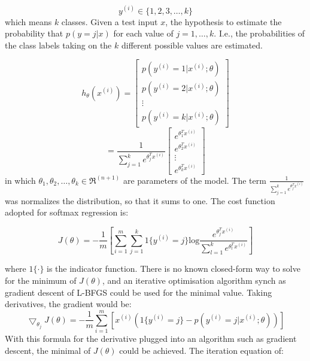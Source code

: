 \documentclass[journal]{IEEEtran}
\begin{document}
\begin{equation}
y^{(i)} \in \{1,2,3,\ldots,k\}
\end{equation}
\noindent which means $k$ classes.
Given a test input $x$, the hypothesis to estimate the probability that $p(y=j|x)$ for each value of $j=1,\ldots,k$. I.e., the probabilities of the class labels taking on the $k$ different possible values are estimated. 

\begin{equation}
h_{\theta}(x^{(i)}) = 
\left[
      \begin{array}{cccccc}
        p(y^{(i)}=1|x^{(i)};\theta) \\
        p(y^{(i)}=2|x^{(i)};\theta) \\
        \vdots \\
        p(y^{(i)}=k|x^{(i)};\theta)
      \end{array}
    \right]
\end{equation}
\begin{equation}
= \frac{1}{\sum_{j=1}^ke^{\theta_j^Tx^{(i)}}}
\left[
      \begin{array}{cccccc}
        e^{\theta_1^Tx^{(i)}}\\
        e^{\theta_2^Tx^{(i)}}\\
        \vdots \\
        e^{\theta_k^Tx^{(i)}}
      \end{array}
    \right]
\end{equation}
\noindent in which $\theta_1,\theta_2,\ldots,\theta_k \in \Re^{(n+1)}$ are parameters of the model. The term $\frac{1}{\sum_{j=1}^ke^{\theta_j^Tx^{(i)}}}$ was normalizes the distribution, so that it sums to one.
The cost function adopted for softmax regression is:

\begin{equation}
J(\theta) = -\frac{1}{m}[\sum_{i=1}^m\sum_{j=1}^k1\{y^{(i)}=j\}\text{log}{\frac{e^{\theta_j^Tx^{(i)}}}{\sum_{l=1}^ke^{\theta_l^Tx^{(i)}}}}]
\end{equation}

where $1\{\cdot\}$ is the indicator function. There is no known closed-form way to solve for the minimum of $J(\theta)$, and an iterative optimisation algorithm synch as gradient descent of L-BFGS could be used for the minimal value.
Taking derivatives, the gradient would be:
\begin{equation}
\bigtriangledown_{\theta_j}J(\theta) = -\frac{1}{m}\sum_{i=1}^m[x^{(i)}(1\{y^{(i)}=j\}-p(y^{(i)}=j|x^{(i)};\theta))]
\end{equation}
With this formula for the derivative plugged into an algorithm such as gradient descent, the minimal of $J(\theta)$ could be achieved. The iteration equation of:
\end{document}
